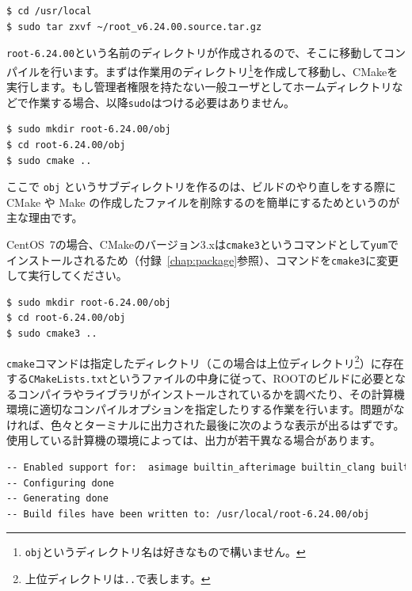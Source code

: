 {\begin{lstlisting}[language=bash]
$ cd /usr/local
$ sudo tar zxvf ~/root_v6.24.00.source.tar.gz
\end{lstlisting}

\texttt{root-6.24.00}という名前のディレクトリが作成されるので、そこに移動してコンパイルを行います。まずは作業用のディレクトリ\footnote{\texttt{obj}というディレクトリ名は好きなもので構いません。}を作成して移動し、CMakeを実行します。もし管理者権限を持たない一般ユーザとしてホームディレクトリなどで作業する場合、以降\texttt{sudo}はつける必要はありません。

\begin{lstlisting}[language=bash]
$ sudo mkdir root-6.24.00/obj
$ cd root-6.24.00/obj
$ sudo cmake ..
\end{lstlisting}

ここで \texttt{obj} というサブディレクトリを作るのは、ビルドのやり直しをする際に CMake や Make の作成したファイルを削除するのを簡単にするためというのが主な理由です。

CentOS~7の場合、CMakeのバージョン3.xは\texttt{cmake3}というコマンドとして\texttt{yum}でインストールされるため（付録~\ref{chap:package}参照）、コマンドを\texttt{cmake3}に変更して実行してください。

\begin{lstlisting}[language=bash]
$ sudo mkdir root-6.24.00/obj
$ cd root-6.24.00/obj
$ sudo cmake3 ..
\end{lstlisting}

\texttt{cmake}コマンドは指定したディレクトリ（この場合は上位ディレクトリ\footnote{上位ディレクトリは\texttt{..}で表します。}）に存在する\texttt{CMakeLists.txt}というファイルの中身に従って、ROOTのビルドに必要となるコンパイラやライブラリがインストールされているかを調べたり、その計算機環境に適切なコンパイルオプションを指定したりする作業を行います。問題がなければ、色々とターミナルに出力された最後に次のような表示が出るはずです。使用している計算機の環境によっては、出力が若干異なる場合があります。
\begin{lstlisting}[language=bash]
-- Enabled support for:  asimage builtin_afterimage builtin_clang builtin_cling builtin_freetype builtin_ftgl builtin_gl2ps builtin_glew builtin_llvm builtin_lz4 builtin_lzma builtin_nlohmannjson builtin_openssl builtin_openui5 builtin_pcre builtin_tbb builtin_vdt builtin_xrootd builtin_xxhash builtin_zstd clad cocoa dataframe exceptions gdml http imt libcxx mlp opengl pyroot roofit runtime_cxxmodules shared sqlite ssl tmva tmva-cpu spectrum vdt xml xrootd
-- Configuring done
-- Generating done
-- Build files have been written to: /usr/local/root-6.24.00/obj
\end{lstlisting}

}
